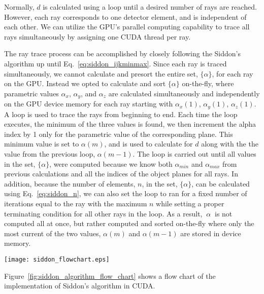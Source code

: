 Normally, $d$ is calculated using a loop until a desired number of rays are reached.  However, each ray corresponds to one detector element, and is independent of each other.  We can utilize the GPU's parallel computing capability to trace all rays simultaneously by assigning one CUDA thread per ray.

The ray trace process can be accomplished by closely following the Siddon's algorithm up until Eq.~\ref{eq:siddon_ijkminmax}.  Since each ray is traced simultaneously, we cannot calculate and presort the entire set, $\{ \alpha \}$, for each ray on the GPU.  Instead we opted to calculate and sort $\{ \alpha \}$ on-the-fly, where parametric values $\alpha_x$, $\alpha_y$, and $\alpha_z$ are calculated simultaneously and independently on the GPU device memory for each ray starting with $\alpha_x(1)$, $\alpha_y(1)$, $\alpha_z(1)$.  A loop is used to trace the rays from beginning to end.  Each time the loop executes, the minimum of the three values is found, we then increment the alpha index by 1 only for the parametric value of the corresponding plane.  This minimum value is set to $\alpha(m)$, and is used to calculate for $d$ along with the the value from the previous loop, $\alpha(m-1)$.  The loop is carried out until all values in the set, $\{ \alpha \}$, were computed because we know both $\alpha_{min}$ and $\alpha_{max}$ from previous calculations and all the indices of the object planes for all rays.  In addition, because the number of elements, $n$, in the set, $\{ \alpha \} $, can be calculated using Eq.~\ref{eq:siddon_n}, we can also set the loop to ran for a fixed number of iterations equal to the ray with the maximum $n$ while setting a proper terminating condition for all other rays in the loop.  As a result, $\ {\alpha\ }$ is not computed all at once, but rather computed and sorted on-the-fly where only the most current of the two values, $\alpha(m)$ and $\alpha(m-1)$ are stored in device memory.  
%
\begin{sidewaysfigure}
\texttt{[image: siddon\_flowchart.eps]}
\caption{A flow chart of Siddon's algorithm implementation on CUDA}
\label{fig:siddon_algorithm_flow_chart}
\end{sidewaysfigure}
%
Figure~\ref{fig:siddon_algorithm_flow_chart} shows a flow chart of the implementation of Siddon's algorithm in CUDA.

